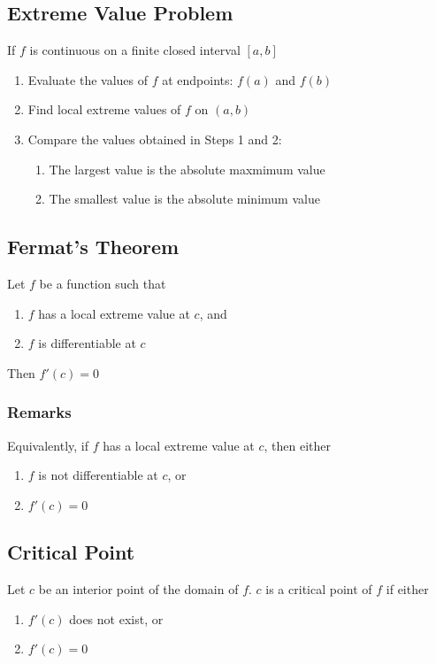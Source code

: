 \documentclass[../ma2002_notes.tex]{subfiles}
\begin{document}
\subsection{Extreme Value Problem}
If \(f\) is continuous on a finite closed interval \([a,b]\)
\begin{enumerate}
	\item Evaluate the values of \(f\) at endpoints: \(f(a)\) and \(f(b)\)
	\item Find local extreme values of \(f\) on \((a,b)\)
	\item Compare the values obtained in Steps 1 and 2:
	\begin{enumerate}
		\item The largest value is the absolute maxmimum value
		\item The smallest value is the absolute minimum value
	\end{enumerate}
\end{enumerate}

\subsection{Fermat's Theorem}
Let \(f\) be a function such that
\begin{enumerate}
	\item \(f\) has a local extreme value at \(c\), and
	\item \(f\) is differentiable at \(c\)
\end{enumerate}
Then \(f'(c)=0\)

\subsubsection{Remarks}
Equivalently, if \(f\) has a local extreme value at \(c\), then either
\begin{enumerate}
	\item \(f\) is not differentiable at \(c\), or
	\item \(f'(c)=0\)
\end{enumerate}

\subsection{Critical Point}
Let \(c\) be an interior point of the domain of \(f\). \(c\) is a critical point of \(f\) if either
\begin{enumerate}
	\item \(f'(c)\) does not exist, or
	\item \(f'(c)=0\)
\end{enumerate}
\end{document}
